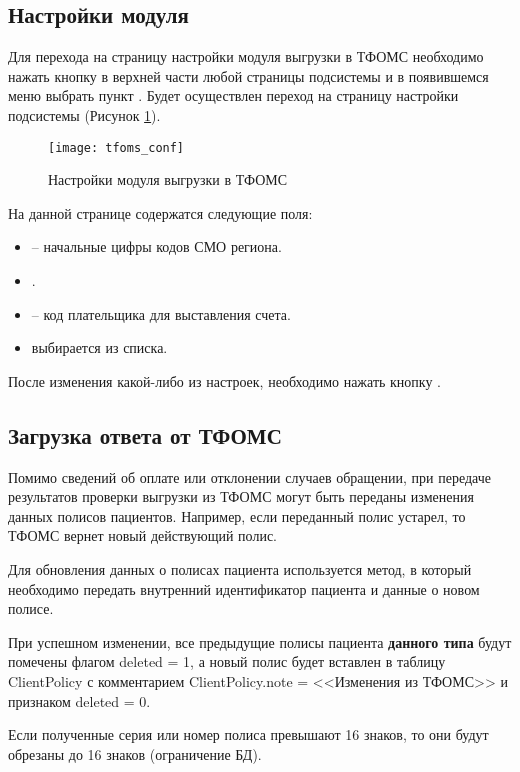 \subsection{Настройки модуля}

Для перехода на страницу настройки модуля выгрузки в ТФОМС необходимо нажать кнопку   в верхней части любой страницы подсистемы и в появившемся меню выбрать пункт . Будет осуществлен переход на страницу настройки подсистемы (Рисунок \ref{img_tfoms_conf}).

\begin{figure}[ht]\centering
 \texttt{[image: tfoms\_conf]}
 \caption{Настройки модуля выгрузки в ТФОМС}
 \label{img_tfoms_conf}
\end{figure}

На данной странице содержатся следующие поля:
\begin{itemize}
 \item {} – начальные цифры кодов СМО региона.
 \item {}.
 \item {} – код плательщика для выставления счета.
 \item {} выбирается из списка.
\end{itemize}
 
После изменения какой-либо из настроек, необходимо нажать кнопку .

\subsection{Загрузка ответа от ТФОМС}

Помимо сведений об оплате или отклонении случаев обращении, при передаче результатов проверки выгрузки из ТФОМС могут быть переданы изменения данных полисов пациентов. Например, если переданный полис устарел, то ТФОМС вернет новый действующий полис.

Для обновления данных о полисах пациента используется метод, в который необходимо передать внутренний идентификатор пациента и данные о новом полисе.

При успешном изменении, все предыдущие полисы пациента \textbf{данного типа} будут помечены флагом deleted = 1, а новый полис будет вставлен в таблицу ClientPolicy с комментарием ClientPolicy.note = <<Изменения из ТФОМС>> и признаком deleted = 0.

Если полученные серия или номер полиса превышают 16 знаков, то они будут обрезаны до 16 знаков (ограничение БД).

